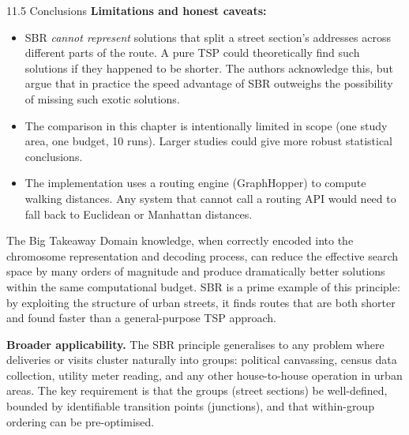 \documentclass[aspectratio=169,10pt]{beamer}
\begin{document}
\begin{frame}[allowframebreaks]{11.5 Conclusions}
  \textbf{Limitations and honest caveats:}

  \begin{itemize}
    \item SBR \emph{cannot represent} solutions that split a street section's
          addresses across different parts of the route.  A pure TSP could
          theoretically find such solutions if they happened to be shorter.
          The authors acknowledge this, but argue that in practice the speed
          advantage of SBR outweighs the possibility of missing such exotic
          solutions.
    \item The comparison in this chapter is intentionally limited in scope
          (one study area, one budget, 10 runs).  Larger studies could
          give more robust statistical conclusions.
    \item The implementation uses a routing engine (GraphHopper) to compute
          walking distances.  Any system that cannot call a routing API would
          need to fall back to Euclidean or Manhattan distances.
  \end{itemize}

  \framebreak

  \begin{alertblock}{The Big Takeaway}
    Domain knowledge, when correctly encoded into the chromosome representation
    and decoding process, can reduce the effective search space by many orders
    of magnitude and produce dramatically better solutions within the same
    computational budget.  SBR is a prime example of this principle: by
    exploiting the structure of urban streets, it finds routes that are both
    shorter and found faster than a general-purpose TSP approach.
  \end{alertblock}

  \textbf{Broader applicability.}  The SBR principle generalises to any
  problem where deliveries or visits cluster naturally into groups:
  political canvassing, census data collection, utility meter reading,
  and any other house-to-house operation in urban areas.  The key requirement
  is that the groups (street sections) be well-defined, bounded by identifiable
  transition points (junctions), and that within-group ordering can be
  pre-optimised.


\end{frame}
\end{document}
